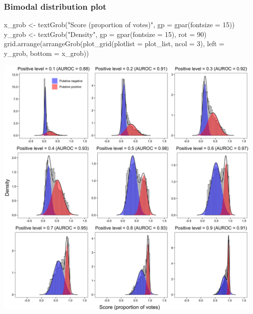 \documentclass[
  11pt,
  oneside]{book}
\newenvironment{Shaded}{\begin{snugshade}}{\end{snugshade}}
\newcommand{\AttributeTok}[1]{\textcolor[rgb]{0.77,0.63,0.00}{#1}}
\newcommand{\DecValTok}[1]{\textcolor[rgb]{0.00,0.00,0.81}{#1}}
\newcommand{\FunctionTok}[1]{\textcolor[rgb]{0.00,0.00,0.00}{#1}}
\newcommand{\NormalTok}[1]{#1}
\newcommand{\OtherTok}[1]{\textcolor[rgb]{0.56,0.35,0.01}{#1}}
\newcommand{\StringTok}[1]{\textcolor[rgb]{0.31,0.60,0.02}{#1}}
\begin{document}
\hypertarget{bimodal-distribution-plot}{%
\subsubsection{Bimodal distribution plot}\label{bimodal-distribution-plot}}

\begin{Shaded}
\begin{Highlighting}[]
\NormalTok{x\_grob }\OtherTok{\textless{}{-}} \FunctionTok{textGrob}\NormalTok{(}\StringTok{"Score (proportion of votes)"}\NormalTok{, }\AttributeTok{gp =} \FunctionTok{gpar}\NormalTok{(}\AttributeTok{fontsize =} \DecValTok{15}\NormalTok{))}
\NormalTok{y\_grob }\OtherTok{\textless{}{-}} \FunctionTok{textGrob}\NormalTok{(}\StringTok{"Density"}\NormalTok{, }\AttributeTok{gp =} \FunctionTok{gpar}\NormalTok{(}\AttributeTok{fontsize =} \DecValTok{15}\NormalTok{), }\AttributeTok{rot =} \DecValTok{90}\NormalTok{)}
\FunctionTok{grid.arrange}\NormalTok{(}\FunctionTok{arrangeGrob}\NormalTok{(}\FunctionTok{plot\_grid}\NormalTok{(}\AttributeTok{plotlist =}\NormalTok{ plot\_list, }\AttributeTok{ncol =} \DecValTok{3}\NormalTok{), }\AttributeTok{left =}\NormalTok{ y\_grob, }\AttributeTok{bottom =}\NormalTok{ x\_grob))}
\end{Highlighting}
\end{Shaded}

\begin{center}\includegraphics[width=1\linewidth]{./figures/Supplementary Fig 3} \end{center}
\end{document}
